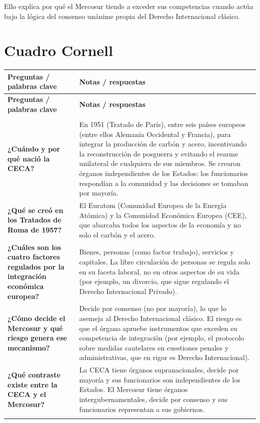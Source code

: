 \documentclass[12pt,oneside]{book}
\newlength{\cornizq}
\newlength{\cornder}
\newlength{\cornancho}
\newenvironment{cornell}
{%
    \small
    \renewcommand{\arraystretch}{1.3}%
    \begin{longtable}{>{\raggedright\arraybackslash}p{\cornizq}!{\vrule width 0.4pt}>{\raggedright\arraybackslash}p{\cornder}}
    \toprule
    \textbf{Preguntas / palabras clave} & \textbf{Notas / respuestas} \\
    \midrule
    \endfirsthead
    \toprule
    \textbf{Preguntas / palabras clave} & \textbf{Notas / respuestas} \\
    \midrule
    \endhead
    \midrule
    \multicolumn{2}{r}{\footnotesize\itshape continúa en la página siguiente} \\
    \endfoot
    \bottomrule
    \endlastfoot
}
{%
    \end{longtable}%
}
\begin{document}
Ello explica por qué el Mercosur tiende a exceder sus competencias cuando actúa bajo la lógica del consenso unánime propia del Derecho Internacional clásico.

\section{Cuadro Cornell}

\begin{cornell}
\textbf{¿Cuándo y por qué nació la CECA?} &
En 1951 (Tratado de París), entre seis países europeos (entre ellos Alemania Occidental y Francia), para integrar la producción de carbón y acero, incentivando la reconstrucción de posguerra y evitando el rearme unilateral de cualquiera de sus miembros. Se crearon órganos independientes de los Estados: los funcionarios respondían a la comunidad y las decisiones se tomaban por mayoría. \\
\textbf{¿Qué se creó en los Tratados de Roma de 1957?} &
El Euratom (Comunidad Europea de la Energía Atómica) y la Comunidad Económica Europea (CEE), que abarcaba todos los aspectos de la economía y no solo el carbón y el acero. \\
\textbf{¿Cuáles son los cuatro factores regulados por la integración económica europea?} &
Bienes, personas (como factor trabajo), servicios y capitales. La libre circulación de personas se regula solo en su faceta laboral, no en otros aspectos de su vida (por ejemplo, un divorcio, que sigue regulando el Derecho Internacional Privado). \\
\textbf{¿Cómo decide el Mercosur y qué riesgo genera ese mecanismo?} &
Decide por consenso (no por mayoría), lo que lo asemeja al Derecho Internacional clásico. El riesgo es que el órgano apruebe instrumentos que exceden su competencia de integración (por ejemplo, el protocolo sobre medidas cautelares en cuestiones penales y administrativas, que en rigor es Derecho Internacional). \\
\textbf{¿Qué contraste existe entre la CECA y el Mercosur?} &
La CECA tiene órganos supranacionales, decide por mayoría y sus funcionarios son independientes de los Estados. El Mercosur tiene órganos intergubernamentales, decide por consenso y sus funcionarios representan a sus gobiernos. \\
\midrule
{} \\
\end{cornell}
\end{document}
